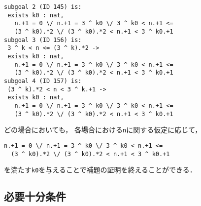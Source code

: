 {\begin{lstlisting}[language=Coq]
subgoal 2 (ID 145) is:
 exists k0 : nat,
   n.+1 = 0 \/ n.+1 = 3 ^ k0 \/ 3 ^ k0 < n.+1 <=
   (3 ^ k0).*2 \/ (3 ^ k0).*2 < n.+1 < 3 ^ k0.+1
subgoal 3 (ID 156) is:
 3 ^ k < n <= (3 ^ k).*2 ->
 exists k0 : nat,
   n.+1 = 0 \/ n.+1 = 3 ^ k0 \/ 3 ^ k0 < n.+1 <=
   (3 ^ k0).*2 \/ (3 ^ k0).*2 < n.+1 < 3 ^ k0.+1
subgoal 4 (ID 157) is:
 (3 ^ k).*2 < n < 3 ^ k.+1 ->
 exists k0 : nat,
   n.+1 = 0 \/ n.+1 = 3 ^ k0 \/ 3 ^ k0 < n.+1 <=
   (3 ^ k0).*2 \/ (3 ^ k0).*2 < n.+1 < 3 ^ k0.+1
\end{lstlisting}
どの場合においても，
各場合における{\tt{n}}に関する仮定に応じて，
\begin{lstlisting}[language=Coq]
  n.+1 = 0 \/ n.+1 = 3 ^ k0 \/ 3 ^ k0 < n.+1 <=
  (3 ^ k0).*2 \/ (3 ^ k0).*2 < n.+1 < 3 ^ k0.+1
\end{lstlisting}
を満たす{\tt{k0}}を与えることで補題の証明を終えることができる．

\subsection{必要十分条件}

}
